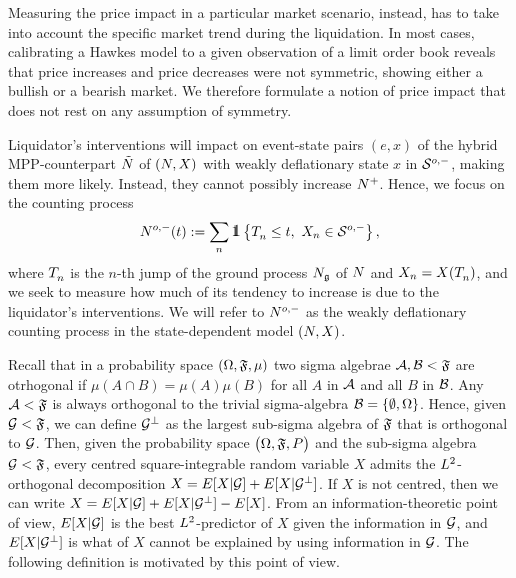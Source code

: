 \documentclass[10pt, article,table]{article}
\begin{document}
Measuring the price impact in a particular market scenario, instead, has to take into account the specific market trend during the liquidation. In most cases, calibrating a Hawkes model to a given observation of a limit order book reveals that price increases and price decreases were not symmetric, showing either a bullish or a bearish market. We therefore formulate a notion of price impact that does not rest on any assumption of symmetry. 

Liquidator's interventions will impact on event-state pairs $(e,x)$ of the hybrid MPP-counterpart $\hybridHawkes$ of $\sdHawkesPair$ with weakly deflationary state $x$ in $\weakDeflSpace$, making them more likely. Instead, they cannot possibly increase $\Nplus$. Hence, we focus on the counting process 
\begin{equation}\label{eq.weakly_deflationary_coutning_process}
 \weakDeflPP (t) : = \sum_{n}\one\left\lbrace
 \arrivalTimes[]_n \leq t, \, \, \stateVariable_n \in \weakDeflSpace
 \right\rbrace,
\end{equation}
where $\arrivalTimes[]_n$ is the $n$-th jump of the ground process $\groundProc$ of $\multiCountingProc$ and $\stateVariable_n = \stateVariable(\arrivalTimes[]_n)$, and we seek to measure how much of its tendency to increase is due to the liquidator's interventions. We will refer to $\weakDeflPP$ as the weakly deflationary counting process in the state-dependent model $\sdHawkesPair$.

Recall that in a probability space $(\Omega,\sigmaAlgebra,\mu)$ two sigma algebrae $\setAlgebraA, \setAlgebraB < \sigmaAlgebra$ are otrhogonal if $\mu(A\cap B)=\mu(A)\mu(B)$ for all $A$ in $\setAlgebraA$ and all $B$ in $\setAlgebraB$. Any $\setAlgebraA < \sigmaAlgebra$ is always orthogonal to the trivial sigma-algebra $\setAlgebraB = \lbrace \emptyset, \Omega\rbrace$. Hence, given $\sigmaAlgebraG < \sigmaAlgebra$, we can define
$\sigmaAlgebraG\orthogonal$ as the largest sub-sigma algebra of $\sigmaAlgebra$ that is orthogonal to $\sigmaAlgebraG$. Then, given the probability space $\probabilitySpace$ and the sub-sigma algebra $\sigmaAlgebraG < \sigmaAlgebra$, every centred square-integrable random variable $X$ admits the $\Ltwo$-orthogonal decomposition $X = \Expectation[X\vert \sigmaAlgebraG] + \Expectation[X\vert\sigmaAlgebraG\orthogonal]$.
If $X$ is not centred, then we can write $X = \Expectation[X\vert \sigmaAlgebraG] + \Expectation[X\vert\sigmaAlgebraG\orthogonal] - \Expectation[X]$.
From an information-theoretic point of view, $\Expectation[X\vert\sigmaAlgebraG]$ is the best $\Ltwo$-predictor of $X$ given the information in $\sigmaAlgebraG$, and $\Expectation[X\vert\sigmaAlgebraG\orthogonal]$ is what of $X$ cannot be explained by using information in $\sigmaAlgebraG$. The following definition is motivated by this point of view. 
\end{document}
